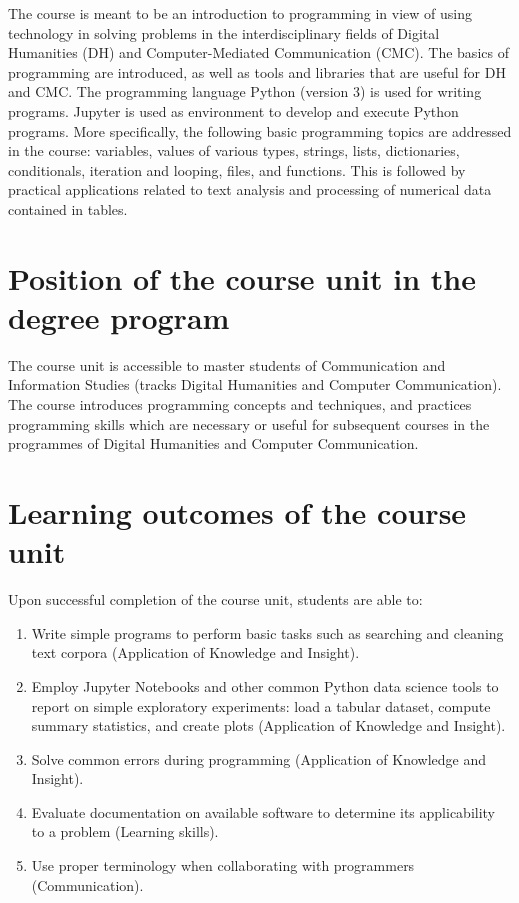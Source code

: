 \documentclass[a4paper,12pt]{article}
\begin{document}
The course is meant to be an introduction to programming in view of using
technology in solving problems in the interdisciplinary fields of Digital
Humanities (DH) and Computer-Mediated Communication (CMC). The basics of
programming are introduced, as well as tools and libraries
that are useful for DH and CMC. The programming language Python
(version 3) is used for writing programs. Jupyter is used as environment to
develop and execute Python programs. More specifically, the following basic
programming topics are addressed in the course: variables, values of various
types, strings, lists, dictionaries, conditionals, iteration and looping,
files, and functions. This is followed by practical applications related to
text analysis and processing of numerical data contained in tables.

\section{Position of the course unit in the degree program}
The course unit is accessible to master students of Communication and
Information Studies (tracks Digital Humanities and Computer Communication).
The course introduces programming concepts and techniques, and practices
programming skills which are necessary or useful for subsequent courses in the
programmes of Digital Humanities and Computer Communication.

\section{Learning outcomes of the course unit}

Upon successful completion of the course unit, students are able to:

\begin{enumerate}
    \item Write simple programs to perform basic tasks such as searching and
        cleaning text corpora
        (Application of Knowledge and Insight).
    \item Employ Jupyter Notebooks and other common Python data science
        tools to report on simple exploratory experiments: load a tabular
        dataset, compute summary statistics, and create plots
        (Application of Knowledge and Insight).
    \item Solve common errors during programming
        (Application of Knowledge and Insight).
    \item Evaluate documentation on available software to determine its
        applicability to a problem (Learning skills).
    \item Use proper terminology when collaborating with programmers
        (Communication).
\end{enumerate}
\end{document}
